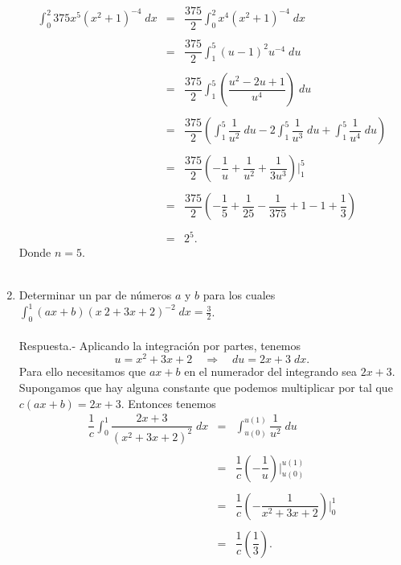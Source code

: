\begin{enumerate}[\bfseries 1.]
	$$
	\begin{array}{rcl}
	    \displaystyle\int_0^2 375x^5\left(x^2+1\right)^{-4}\; dx &=& \dfrac{375}{2}\displaystyle\int_0^2 x^4\left(x^2+1\right)^{-4}\; dx\\\\
								     &=& \dfrac{375}{2}\displaystyle\int_1^5 (u-1)^2u^{-4}\; du\\\\
								     &=& \dfrac{375}{2}\displaystyle\int_1^5 \left(\dfrac{u^2-2u+1}{u^4}\right)\; du\\\\
								     &=& \dfrac{375}{2} \left(\displaystyle\int_1^5\dfrac{1}{u^2}\; du-2\int_1^5 \dfrac{1}{u^3}\; du + \int_1^5\dfrac{1}{u^4}\; du\right)\\\\
								     &=& \dfrac{375}{2} \left(-\dfrac{1}{u} + \dfrac{1}{u^2} + \dfrac{1}{3u^3}\right)\bigg|_{1}^{5}\\\\
								     &=& \dfrac{375}{2} \left(-\dfrac{1}{5} + \dfrac{1}{25} - \dfrac{1}{375}+1-1+\dfrac{1}{3}\right)\\\\
								     &=& 2^5.
	\end{array}
	$$
	Donde $n=5$.\\\\

    \item Determinar un par de números $a$ y $b$ para los cuales $\displaystyle\int_0^1(ax+b)\left(x~ 2+3x+2\right)^{-2}\; dx=\frac{3}{2}$.\\\\
	Respuesta.-\; Aplicando la integración por partes, tenemos
	$$u=x^2+3x+2\quad \Rightarrow \quad du=2x+3\; dx.$$
	Para ello necesitamos que $ax+b$ en el numerador del integrando sea $2x+3$. Supongamos que hay alguna constante que podemos multiplicar por tal que $c(ax+b)=2x+3$. Entonces tenemos
	$$
	\begin{array}{rcl}
	    \dfrac{1}{c}\displaystyle\int_0^1\dfrac{2x+3}{\left(x^2+3x+2\right)^2}\; dx &=& \displaystyle\int_{u(0)}^{u(1)}\dfrac{1}{u^2}\; du\\\\
											&=&  \dfrac{1}{c}\left(-\dfrac{1}{u}\right)\bigg|_{u(0)}^{u(1)}\\\\
											&=& \dfrac{1}{c}\left(-\dfrac{1}{x^2+3x+2}\right)\bigg|_0^1\\\\
											&=& \dfrac{1}{c}\left(\dfrac{1}{3}\right).
	\end{array}
	$$


\end{enumerate}
